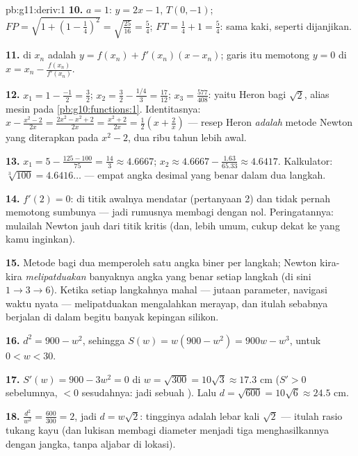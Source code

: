 \begin{solution}{pb:g11:deriv:1}
\textbf{10.} $a = 1$:  $y = 2x - 1$, $T(0, -1)$;
$FP = \sqrt{1 + \left(1 - \frac14\right)^2} =
\sqrt{\frac{25}{16}} = \frac54$; $FT = \frac14 + 1 = \frac54$:
sama kaki, seperti dijanjikan.

\textbf{11.}  di $x_n$ adalah
$y = f(x_n) + f'(x_n)(x - x_n)$; garis itu memotong $y = 0$ di
$x = x_n - \frac{f(x_n)}{f'(x_n)}$.

\textbf{12.} $x_1 = 1 - \frac{-1}{2} = \frac32$;
$x_2 = \frac32 - \frac{1/4}{3} = \frac{17}{12}$;
$x_3 = \frac{577}{408}$: yaitu  Heron bagi $\sqrt2$,
alias mesin  pada \cref{pb:g10:functions:1}.
Identitasnya: $x - \frac{x^2 - 2}{2x} = \frac{2x^2 - x^2 + 2}{2x}
= \frac{x^2 + 2}{2x} = \frac12\left(x + \frac2x\right)$ ---
resep Heron \emph{adalah} metode Newton yang diterapkan pada
$x^2 - 2$, dua ribu tahun lebih awal.

\textbf{13.} $x_1 = 5 - \frac{125 - 100}{75} = \frac{14}{3}
\approx 4.6667$; $x_2 \approx 4.6667 - \frac{1.63}{65.33}
\approx 4.6417$. Kalkulator: $\sqrt[3]{100} = 4.6416\ldots$ ---
empat angka desimal yang benar dalam dua langkah.

\textbf{14.} $f'(2) = 0$:  di titik awalnya
mendatar (pertanyaan 2) dan tidak pernah memotong sumbunya --- jadi
rumusnya membagi dengan nol. Peringatannya: mulailah Newton jauh dari
titik kritis (dan, lebih umum, cukup dekat ke  yang
kamu inginkan).

\textbf{15.} Metode bagi dua memperoleh satu angka biner per langkah;
Newton kira-kira \emph{melipatduakan} banyaknya angka yang benar setiap
langkah (di sini $1 \to 3 \to 6$). Ketika setiap langkahnya mahal --- jutaan
parameter, navigasi waktu nyata --- melipatduakan mengalahkan
merayap, dan itulah sebabnya  berjalan di dalam begitu banyak
kepingan silikon.

\textbf{16.} $d^2 = 900 - w^2$, sehingga
$S(w) = w(900 - w^2) = 900w - w^3$, untuk $0 < w < 30$.

\textbf{17.} $S'(w) = 900 - 3w^2 = 0$ di
$w = \sqrt{300} = 10\sqrt3 \approx 17.3$ cm ($S' > 0$ sebelumnya,
$< 0$ sesudahnya: jadi sebuah ). Lalu
$d = \sqrt{600} = 10\sqrt6 \approx 24.5$ cm.

\textbf{18.} $\frac{d^2}{w^2} = \frac{600}{300} = 2$, jadi
$d = w\sqrt2$: tingginya adalah lebar kali $\sqrt2$ --- itulah
rasio tukang kayu (dan lukisan membagi diameter menjadi tiga
menghasilkannya dengan jangka, tanpa aljabar di lokasi).


\end{solution}
